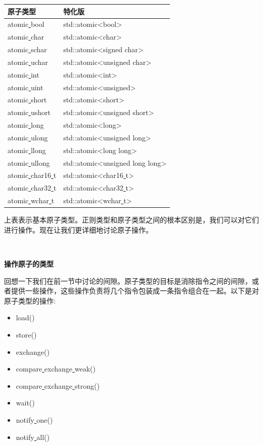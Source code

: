 \begin{table}[h]
	\begin{tabularx}{\textwidth}{|X|X|}
		\hline 原子类型  & 特化版 \\ 
		\hline atomic\underline{ }bool   & std::atomic<bool> \\
		\hline atomic\underline{ }char   & std::atomic<char> \\
		\hline atomic\underline{ }schar   & std::atomic<signed char> \\
		\hline atomic\underline{ }uchar   & std::atomic<unsigned char> \\ 
		\hline atomic\underline{ }int   & std::atomic<int> \\
		\hline atomic\underline{ }uint   & std::atomic<unsigned> \\
		\hline atomic\underline{ }short   & std::atomic<short> \\
		\hline atomic\underline{ }ushort   & std::atomic<unsigned short> \\ 
		\hline atomic\underline{ }long   & std::atomic<long> \\
		\hline atomic\underline{ }ulong   & std::atomic<unsigned long> \\
		\hline atomic\underline{ }llong   & std::atomic<long long> \\
		\hline atomic\underline{ }ullong   & std::atomic<unsigned long long> \\
		\hline atomic\underline{ }char16\underline{ }t   & std::atomic<char16\underline{ }t> \\
		\hline atomic\underline{ }char32\underline{ }t   & std::atomic<char32\underline{ }t> \\
		\hline atomic\underline{ }wchar\underline{ }t   & std::atomic<wchar\underline{ }t> \\
		\hline
	\end{tabularx}
\end{table}

上表表示基本原子类型。正则类型和原子类型之间的根本区别是，我们可以对它们进行操作。现在让我们更详细地讨论原子操作。 \par

\noindent\textbf{}\ \par
\textbf{操作原子的类型} \ \par
回想一下我们在前一节中讨论的间隙。原子类型的目标是消除指令之间的间隙，或者提供一些操作，这些操作负责将几个指令包装成一条指令组合在一起。以下是对原子类型的操作: \par

\begin{itemize}
	\item load()
	\item store()
	\item exchange()
	\item compare\underline{ }exchange\underline{ }weak()
	\item compare\underline{ }exchange\underline{ }strong()
	\item wait()
	\item notify\underline{ }one()
	\item notify\underline{ }all()
\end{itemize}

